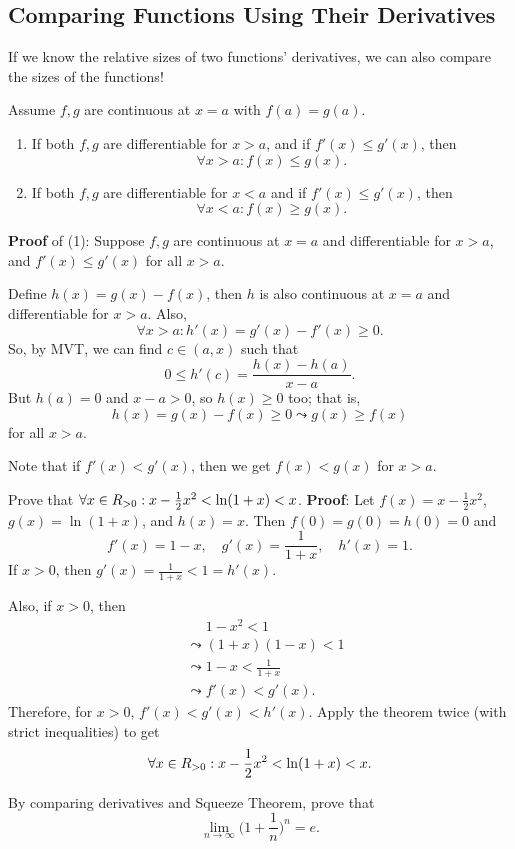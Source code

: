 \subsection{Comparing Functions Using Their Derivatives}
If we know the relative sizes of two functions' derivatives, we can also compare the sizes of the functions!
\begin{Theorem}{}{}
    Assume $ f,g $ are continuous at $ x=a $ with $ f(a)=g(a) $.
    \begin{enumerate}[(1)]
        \item If both $ f,g $ are differentiable for $ x>a $, and if $ f'(x)\le g'(x) $, then
              \[ \forall x>a: f(x)\le g(x). \]
        \item If both $ f,g $ are differentiable for $ x<a $ and if $ f'(x)\le g'(x) $, then
              \[ \forall x<a:f(x)\ge g(x). \]
    \end{enumerate}
    \tcblower{}
    \textbf{Proof} of (1): Suppose $ f,g $ are continuous at $ x=a $ and differentiable for $ x>a $,
    and $ f'(x)\le g'(x) $ for all $ x>a $.

    Define $ h(x)=g(x)-f(x) $, then $ h $ is also continuous at $ x=a $ and differentiable for $ x>a $. Also,
    \[ \forall x>a:h'(x)=g'(x)-f'(x)\ge 0. \]
    So, by MVT, we can find $ c\in(a,x) $ such that
    \[ 0\le h'(c)=\frac{h(x)-h(a)}{x-a}. \]
    But $ h(a)=0 $ and $ x-a>0 $, so $ h(x)\ge 0 $ too; that is,
    \[ h(x)=g(x)-f(x)\ge 0\leadsto g(x)\ge f(x) \]
    for all $ x>a $.
\end{Theorem}
\begin{Remark}{}{}
    Note that if $ f'(x)<g'(x) $, then we get $ f(x)<g(x) $ for $ x>a $.
\end{Remark}
\begin{Example}{}{}
    Prove that $ \forall x\in\relax{R}_{>0}: x-\frac{1}{2}x^2<\ln(1+x)<x $.
    \tcblower{}
    \textbf{Proof}: Let $ f(x)=x-\frac{1}{2}x^2 $, $ g(x)=\ln(1+x) $, and $ h(x)=x $. Then $ f(0)=g(0)=h(0)=0 $
    and
    \[ f'(x)=1-x,\quad g'(x)=\frac{1}{1+x},\quad h'(x)=1.\]
    If $ x>0 $, then $ g'(x)=\frac{1}{1+x}<1=h'(x) $.

    Also, if $ x>0 $, then
    \begin{align*}
         & \phantom{{}\leadsto{}}1-x^2<1 \\
         & \leadsto (1+x)(1-x)<1         \\
         & \leadsto 1-x<\frac{1}{1+x}    \\
         & \leadsto f'(x)<g'(x).
    \end{align*}
    Therefore, for $ x>0 $, $ f'(x)<g'(x)<h'(x) $. Apply the theorem twice (with strict inequalities) to get
    \[ \forall x\in\relax{R}_{>0}:x-\frac{1}{2}x^2<\ln(1+x)<x. \]
\end{Example}
\begin{Exercise}{}{}
    By comparing derivatives and Squeeze Theorem, prove that
    \[ \lim\limits_{{n} \to {\infty}}\biggl(1+\frac{1}{n}\biggr)^{\!n}=e. \]
\end{Exercise}
